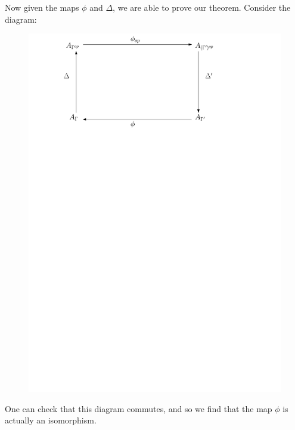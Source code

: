 \documentclass{beamer}
\begin{document}
\begin{frame}
Now given the maps $\phi$ and $\Delta$, we are able to prove our theorem. Consider the diagram:
\begin{figure}
\includegraphics[scale = .50]{Comm-Diag.pdf}
\end{figure}
One can check that this diagram commutes, and so we find that the map $\phi$ is actually an isomorphism.
\end{frame}
\end{document}
